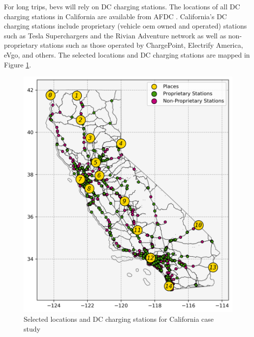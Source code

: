 \documentclass[11pt]{article}
\begin{document}
\begin{multicols}{2}
For long trips, \glspl{bev} will rely on DC charging stations. The locations of all DC charging stations in California are available from AFDC \cite{afdc_2023}. California's DC charging stations include proprietary (vehicle \gls{oem} owned and operated) stations such as Tesla Superchargers and the Rivian Adventure network as well as non-proprietary stations such as those operated by ChargePoint, Electrify America, eVgo, and others. The selected locations and DC charging stations are mapped in Figure \ref{fig:california_atlas}.

\begin{figure}[H]
	\centering
	\includegraphics[width = \linewidth]{figs/California_Places_Chargers.png}
	\caption{Selected locations and DC charging stations for California case study}
	\label{fig:california_atlas}
\end{figure}


\end{multicols}
\end{document}
